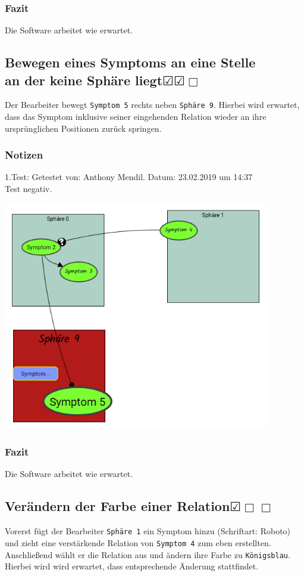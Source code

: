 \documentclass{scrartcl}
\newcommand{\subsectiont}[2]{\subsection[#1]{#1{\normalsize\normalfont #2}}}
\newcommand{\leer}{$\Box$}
\newcommand{\ok}{$\CheckedBox$}
\begin{document}
\subsubsection{Fazit}
Die Software arbeitet wie erwartet.

\subsectiont{Bewegen eines Symptoms an eine Stelle \\an der keine Sphäre liegt}{\dotfill\ok\ok\leer}
Der Bearbeiter bewegt \texttt{Symptom 5} rechts neben \texttt{Sphäre 9}. Hierbei wird erwartet, dass das Symptom inklusive seiner eingehenden Relation wieder an ihre ursprünglichen Positionen zurück springen. 
\subsubsection{Notizen}
1.Test: Getestet von: Anthony Mendil. Datum: 23.02.2019 um 14:37 \\
Test negativ.
\begin{center}
\includegraphics[height=10cm]{2_31.PNG}
\end{center}
\subsubsection{Fazit}
Die Software arbeitet wie erwartet.

\subsectiont{Verändern der Farbe einer Relation}{\dotfill\ok\leer\leer}
Vorerst fügt der Bearbeiter \texttt{Sphäre 1} ein Symptom hinzu (Schriftart: Roboto) und zieht eine verstärkende Relation von \texttt{Symptom 4} zum eben erstellten. Anschließend wählt er die Relation aus und ändern ihre Farbe zu \texttt{Königsblau}. Hierbei wird wird erwartet, dass entsprechende Änderung stattfindet. 
\end{document}
